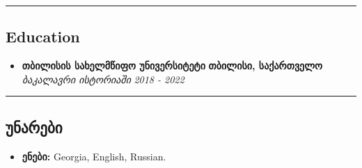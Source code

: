 \documentclass[10pt,letterpaper]{article}
\begin{document}
\hrule
\vspace{-1.0em}
\subsection*{Education}
  \begin{itemize}
    \parskip=1em
      \vspace{0.05em}

    \item[]
    {\textbf{თბილისის სახელმწიფო უნივერსიტეტი}}
     \hfill
     \textbf{თბილისი, საქართველო}
    \\
    {\emph{ბაკალავრი ისტორიაში}
     \hfill
     \emph{2018 - 2022}}

  \end{itemize}

\hrule
\vspace{-1.0em}
\subsection*{უნარები}
\begin{itemize}
  \parskip=-0.5em
  \vspace{0.05em}
  \item[] \textbf{ენები:} Georgia, English, Russian.
\end{itemize}
\end{document}
